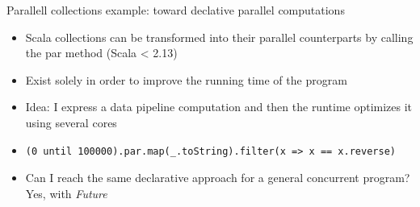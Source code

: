 \documentclass[presentation, 9pt]{beamer}\mode<presentation>{\usetheme{AMSBolognaFC}}
\begin{document}
\begin{frame}[fragile]{Parallell collections example: toward declative parallel computations}
	\begin{itemize}
		\item Scala collections can be transformed into their parallel counterparts by calling the par
		method (Scala < 2.13)
		\item Exist solely in order to improve the running time of the program
  	\item Idea: I express a data pipeline computation and then the runtime optimizes it using several cores
		\item[] \begin{tcolorbox}[left=0pt, top=0pt, bottom=0pt]
			\begin{verbatim}
(0 until 100000).par.map(_.toString).filter(x => x == x.reverse)
			\end{verbatim}
		\end{tcolorbox}
		\item Can I reach the same declarative approach for a general concurrent program? Yes, with \emph{Future} 
	\end{itemize}
\end{frame}
\end{document}
